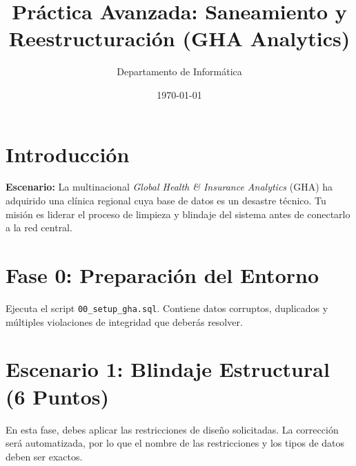 \documentclass[12pt,a4paper]{article}
\title{\textbf{Práctica Avanzada: Saneamiento y Reestructuración (GHA Analytics)}}
\author{Departamento de Informática}
\date{\today}
\begin{document}
\maketitle

\section*{Introducción}
\textbf{Escenario:} La multinacional \textit{Global Health \& Insurance Analytics} (GHA) ha adquirido una clínica regional cuya base de datos es un desastre técnico. Tu misión es liderar el proceso de limpieza y blindaje del sistema antes de conectarlo a la red central.

\section{Fase 0: Preparación del Entorno}
Ejecuta el script \texttt{00\_setup\_gha.sql}. Contiene datos corruptos, duplicados y múltiples violaciones de integridad que deberás resolver.

\section{Escenario 1: Blindaje Estructural (6 Puntos)}
En esta fase, debes aplicar las restricciones de diseño solicitadas. La corrección será automatizada, por lo que el nombre de las restricciones y los tipos de datos deben ser exactos.
\end{document}
